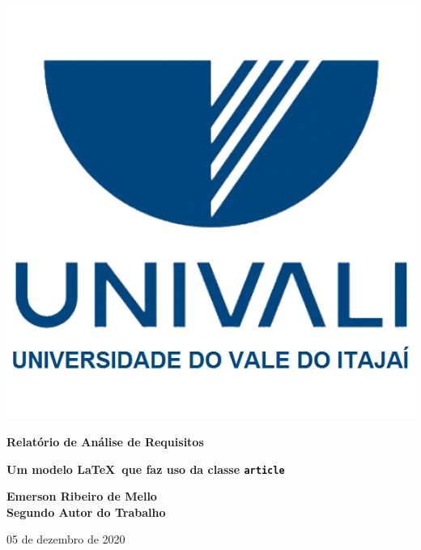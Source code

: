 \documentclass[11pt]{../../classes/univaliarticle}
\begin{document}
\begin{center}

    \includegraphics[scale=.7]{../../classes/imagens/logo-univali.png}
    \vspace{7.5cm}

    {\huge \bfseries Relatório de Análise de Requisitos}

    \vspace{.5cm}

    {\large \bfseries Um modelo \LaTeX~que faz uso da classe \texttt{article}}

    \vfill
\end{center}

{\noindent \large \bfseries
Emerson Ribeiro de Mello%
\\[.5em] Segundo Autor do Trabalho%
}

\begin{flushright}
    05 de dezembro de 2020
\end{flushright}

\clearpage
\pagestyle{firstpage}
\end{document}
